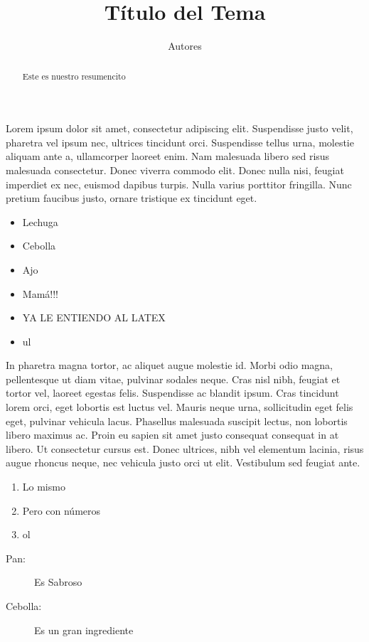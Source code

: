 \documentclass{report}
\title{Título del Tema}
\author{Autores}
\date{}
\begin{document}
    \maketitle

    \begin{abstract}
        Este es nuestro resumencito
    \end{abstract}
    
    Lorem ipsum dolor sit amet, consectetur adipiscing elit. Suspendisse justo velit, pharetra vel ipsum nec, ultrices tincidunt orci. Suspendisse tellus urna, molestie aliquam ante a, ullamcorper laoreet enim. Nam malesuada libero sed risus malesuada consectetur. Donec viverra commodo elit. Donec nulla nisi, feugiat imperdiet ex nec, euismod dapibus turpis. Nulla varius porttitor fringilla. Nunc pretium faucibus justo, ornare tristique ex tincidunt eget.

    \begin{itemize}
        \item Lechuga
        \item Cebolla
        \item Ajo
        \item Mamá!!!
        \item YA LE ENTIENDO AL LATEX
        \item ul
    \end{itemize}

    In pharetra magna tortor, ac aliquet augue molestie id. Morbi odio magna, pellentesque ut diam vitae, pulvinar sodales neque. Cras nisl nibh, feugiat et tortor vel, laoreet egestas felis. Suspendisse ac blandit ipsum. Cras tincidunt lorem orci, eget lobortis est luctus vel. Mauris neque urna, sollicitudin eget felis eget, pulvinar vehicula lacus. Phasellus malesuada suscipit lectus, non lobortis libero maximus ac. Proin eu sapien sit amet justo consequat consequat in at libero. Ut consectetur cursus est. Donec ultrices, nibh vel elementum lacinia, risus augue rhoncus neque, nec vehicula justo orci ut elit. Vestibulum sed feugiat ante.

    \begin{enumerate}
        \item Lo mismo
        \item Pero con números
        \item ol
    \end{enumerate}

    \begin{description}
        \item[Pan:] Es Sabroso
        \item[Cebolla:] Es un gran ingrediente 
    \end{description}
\end{document}
